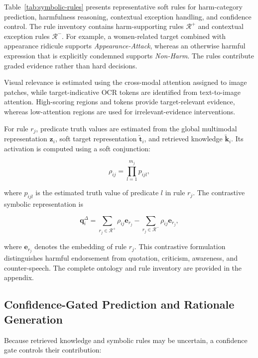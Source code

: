 \documentclass[11pt]{article}
\begin{document}
Table~\ref{tab:symbolic-rules} presents representative soft rules for
harm-category prediction, harmfulness reasoning, contextual exception
handling, and confidence control. The rule inventory contains
harm-supporting rules $\mathcal{R}^{+}$ and contextual exception rules
$\mathcal{R}^{-}$. For example, a women-related target combined with
appearance ridicule supports \textit{Appearance-Attack}, whereas an
otherwise harmful expression that is explicitly condemned supports
\textit{Non-Harm}. The rules contribute graded evidence rather than
hard decisions.

Visual relevance is estimated using the cross-modal attention assigned
to image patches, while target-indicative OCR tokens are identified
from text-to-image attention. High-scoring regions and tokens provide
target-relevant evidence, whereas low-attention regions are used for
irrelevant-evidence interventions.

For rule $r_j$, predicate truth values are estimated from the global
multimodal representation $\mathbf{z}_i$, soft target representation
$\widetilde{\mathbf{t}}_i$, and retrieved knowledge
$\widetilde{\mathbf{k}}_i$. Its activation is computed using a soft
conjunction:

\begin{equation}
\rho_{ij}
=
\prod_{l=1}^{m_j} p_{ijl},
\label{eq:rule-activation}
\end{equation}

where $p_{ijl}$ is the estimated truth value of predicate $l$ in rule
$r_j$. The contrastive symbolic representation is

\begin{equation}
\mathbf{q}^{\Delta}_i
=
\sum_{r_j\in\mathcal{R}^{+}}
\rho_{ij}\mathbf{e}_{r_j}
-
\sum_{r_j\in\mathcal{R}^{-}}
\rho_{ij}\mathbf{e}_{r_j},
\label{eq:contrastive-rule-representation}
\end{equation}

where $\mathbf{e}_{r_j}$ denotes the embedding of rule $r_j$. This
contrastive formulation distinguishes harmful endorsement from
quotation, criticism, awareness, and counter-speech. The complete
ontology and rule inventory are provided in the appendix.

\subsection{Confidence-Gated Prediction and Rationale Generation}
\label{subsec:gated-prediction}

Because retrieved knowledge and symbolic rules may be uncertain, a
confidence gate controls their contribution:
\end{document}
